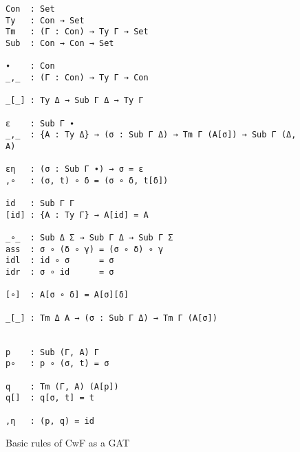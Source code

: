 \begin{figure}
\begin{verbatim}
Con  : Set
Ty   : Con → Set
Tm   : (Γ : Con) → Ty Γ → Set
Sub  : Con → Con → Set

∙    : Con
_,_  : (Γ : Con) → Ty Γ → Con

_[_] : Ty Δ → Sub Γ Δ → Ty Γ

ε    : Sub Γ ∙
_,_  : {A : Ty Δ} → (σ : Sub Γ Δ) → Tm Γ (A[σ]) → Sub Γ (Δ, A)

εη   : (σ : Sub Γ ∙) → σ = ε
,∘   : (σ, t) ∘ δ = (σ ∘ δ, t[δ])

id   : Sub Γ Γ
[id] : {A : Ty Γ} → A[id] = A

_∘_  : Sub Δ Σ → Sub Γ Δ → Sub Γ Σ
ass  : σ ∘ (δ ∘ γ) = (σ ∘ δ) ∘ γ
idl  : id ∘ σ      = σ
idr  : σ ∘ id      = σ

[∘]  : A[σ ∘ δ] = A[σ][δ]

_[_] : Tm Δ A → (σ : Sub Γ Δ) → Tm Γ (A[σ])


p    : Sub (Γ, A) Γ
p∘   : p ∘ (σ, t) = σ

q    : Tm (Γ, A) (A[p])
q[]  : q[σ, t] = t

,η   : (p, q) = id
\end{verbatim}
\caption{Basic rules of CwF as a GAT}
\label{fig:cwf}
\end{figure}
